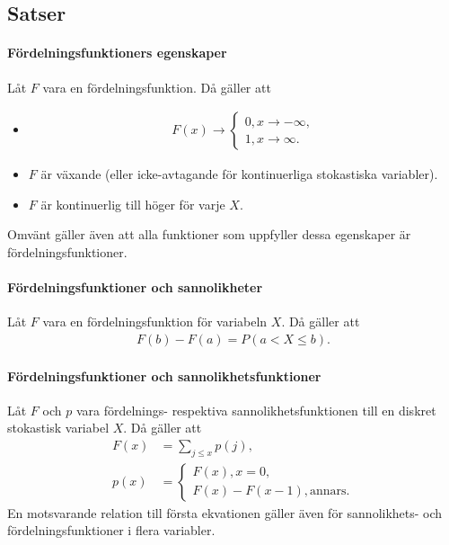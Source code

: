 \subsection{Satser}

\paragraph{Fördelningsfunktioners egenskaper}
Låt $F$ vara en fördelningsfunktion. Då gäller att
\begin{itemize}
	\item
	\begin{align*}
		F(x)\to
		\begin{cases}
			0, x\to -\infty, \\
			1, x\to\infty.
		\end{cases}
	\end{align*}
	\item $F$ är växande (eller icke-avtagande för kontinuerliga stokastiska variabler).
	\item $F$ är kontinuerlig till höger för varje $X$.
\end{itemize}
Omvänt gäller även att alla funktioner som uppfyller dessa egenskaper är fördelningsfunktioner.

\proof

\paragraph{Fördelningsfunktioner och sannolikheter}
Låt $F$ vara en fördelningsfunktion för variabeln $X$. Då gäller att
\begin{align*}
	F(b) - F(a) = P(a < X\leq b).
\end{align*}

\proof

\paragraph{Fördelningsfunktioner och sannolikhetsfunktioner}
Låt $F$ och $p$ vara fördelnings- respektiva sannolikhetsfunktionen till en diskret stokastisk variabel $X$. Då gäller att
\begin{align*}
	F(x) &= \sum\limits_{j\leq x}p(j), \\
	p(x) &=
	\begin{cases}
		F(x), x = 0, \\
		F(x) - F(x - 1), \text{annars}.
	\end{cases}
\end{align*}
En motsvarande relation till första ekvationen gäller även för sannolikhets- och fördelningsfunktioner i flera variabler.

